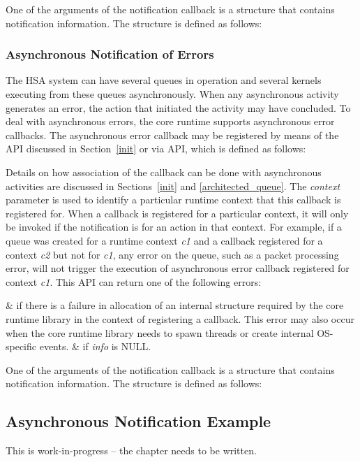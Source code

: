 One of the arguments of the notification callback is a structure
that contains notification information. The structure is defined as
follows:



\subsubsection{Asynchronous Notification of Errors}\label{asynnotif}

The HSA system can have several queues in operation and
several kernels executing from these queues asynchronously.
When any asynchronous activity generates an error, the action that
initiated the activity may have concluded. To deal with
asynchronous errors, the core runtime supports asynchronous error
callbacks. The asynchronous error callback may be registered by means of the
 API discussed in Section~\ref{init} or via
 API, which is defined as
follows:



Details on how association of the callback can be done with
asynchronous activities are discussed in Sections~\ref{init} and
\ref{architected_queue}. The {\itshape context} parameter is used
to identify a particular runtime context that this callback is
registered for. When a callback is registered for a particular
context, it will only be invoked if the notification is for an
action in that context. For example, if a queue was created for a
runtime context {\itshape c1} and a callback registered for a
context {\itshape c2} but not for {\itshape c1}, any error on the
queue, such as a packet processing error, will not trigger the
execution of asynchronous error callback registered for context
{\itshape c1}. This API can return one of the following errors:

\begin{easylist}
&  if there is a failure
in allocation of an internal structure required by the core runtime
library in the context of registering a callback. This error may
also occur when the core runtime library needs to spawn threads or
create internal OS-specific events. 
&  
if {\itshape info} is NULL.
\end{easylist}

One of the arguments of the notification callback is a structure
that contains notification information. The structure is defined as
follows:



\subsection{Asynchronous Notification Example}
This is {\color{red} work-in-progress} -- the chapter needs to be written.
